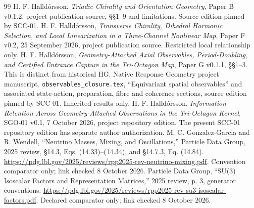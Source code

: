 \documentclass[11pt,a4paper]{article}
\numberwithin{equation}{section}
\begin{document}
\begin{thebibliography}{99}
 H. F. Halldórsson, \emph{Triadic Chirality and Orientation Geometry}, Paper B v0.1.2, project publication source, \S\S1--9 and limitations. Source edition pinned by SCC-01.
 H. F. Halldórsson, \emph{Transverse Chirality, Dihedral Harmonic Selection, and Local Linearization in a Three-Channel Nonlinear Map}, Paper F v0.2, 25 September 2026, project publication source. Restricted local relationship only.
 H. F. Halldórsson, \emph{Geometry-Attached Axial Observables, Period-Doubling, and Certified Entrance Capture in the Tri-Octagon Map}, Paper G v0.1.1, \S\S1--3. This is distinct from historical HG.
 Native Response Geometry project manuscript, \texttt{observables\_closure.tex}, ``Equivariant spatial observables'' and associated state-action, preparation, fibre and coherence sections, source edition pinned by SCC-01. Inherited results only.
 H. F. Halldórsson, \emph{Information Retention Across Geometry-Attached Observations in the Tri-Octagon Kernel}, SGO-01 v0.1, 7 October 2026, project repository edition. The present SCC-01 repository edition has separate author authorization.
 M. C. Gonzalez-Garcia and R. Wendell, ``Neutrino Masses, Mixing, and Oscillations,'' Particle Data Group, 2025 review, \S14.3, Eqs. (14.33)--(14.34), and \S14.7.3, Eq. (14.84). \url{https://pdg.lbl.gov/2025/reviews/rpp2025-rev-neutrino-mixing.pdf}. Convention comparator only; link checked 8 October 2026.
 Particle Data Group, ``SU(3) Isoscalar Factors and Representation Matrices,'' 2025 review, p. 3, generator conventions. \url{https://pdg.lbl.gov/2025/reviews/rpp2025-rev-su3-isoscalar-factors.pdf}. Declared comparator only; link checked 8 October 2026.
\end{thebibliography}
\end{document}
